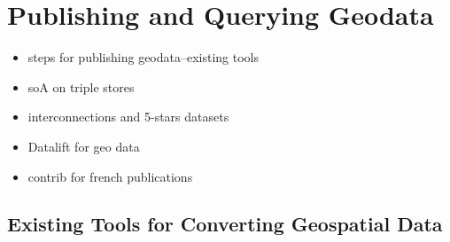 
\chapter{Publishing and Querying Geodata }
\label{ch:ch2}

\begin{itemize}
\item steps for publishing geodata--existing tools
\item soA on triple stores 
\item interconnections and 5-stars datasets
\item Datalift for geo data
\item contrib for french publications
\end{itemize}

\section{Existing Tools for Converting Geospatial Data}
\label{sec:toolgeo}




